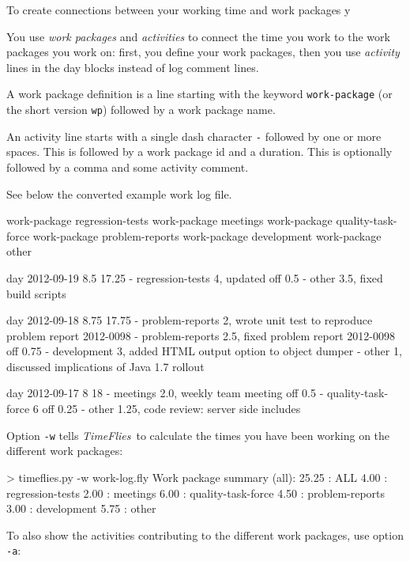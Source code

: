 \documentclass[11pt]{article}
\newcommand{\timeflies}{\emph{TimeFlies}}
\begin{document}
To create connections between your working time and work packages y

You use \emph{work packages} and \emph{activities} to connect the time you work to the work packages you work on: first, you define your work packages, then you use \emph{activity} lines in the day blocks instead of log comment lines.

A work package definition is a line starting with the keyword \verb:work-package: (or the short version \verb:wp:) followed by a work package name.

An activity line starts with a single dash character \verb:-: followed by one or more spaces. This is followed by a work package id and a duration. This is optionally followed by a comma and some activity comment.

See below the converted example work log file.

\begin{inputfile}
work-package regression-tests
work-package meetings
work-package quality-task-force
work-package problem-reports
work-package development
work-package other

day 2012-09-19 8.5 17.25
- regression-tests 4, updated
off 0.5
- other 3.5, fixed build scripts

day 2012-09-18 8.75 17.75
- problem-reports 2, wrote unit test to reproduce problem report 2012-0098
- problem-reports 2.5, fixed problem report 2012-0098
off 0.75
- development 3, added HTML output option to object dumper
- other 1, discussed implications of Java 1.7 rollout

day 2012-09-17 8 18
- meetings 2.0, weekly team meeting
off 0.5
- quality-task-force 6 
off 0.25
- other 1.25, code review: server side includes
\end{inputfile}

Option \verb:-w: tells \timeflies\ to calculate the times you have been working on the different work packages:

\begin{inputfile}
> timeflies.py -w work-log.fly 
Work package summary (all):
 25.25 : ALL
      4.00 : regression-tests
      2.00 : meetings
      6.00 : quality-task-force
      4.50 : problem-reports
      3.00 : development
      5.75 : other
\end{inputfile}

To also show the activities contributing to the different work packages, use option \verb:-a::
\end{document}
